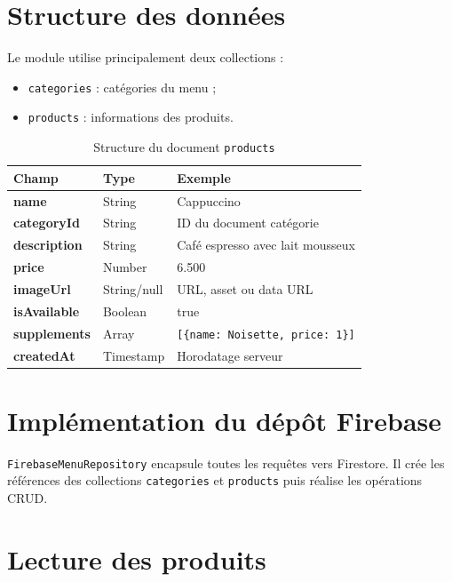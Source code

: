 \documentclass[12pt,a4paper]{report}
\begin{document}
\section{Structure des données}

Le module utilise principalement deux collections :
\begin{itemize}[label=\textbullet]
  \item \texttt{categories} : catégories du menu ;
  \item \texttt{products} : informations des produits.
\end{itemize}

\begin{table}[H]
\centering
\caption{Structure du document \texttt{products}}
\begin{tabularx}{\textwidth}{>{\bfseries}p{3cm}p{3cm}X}
\toprule
Champ & Type & Exemple \\
\midrule
name & String & Cappuccino \\
categoryId & String & ID du document catégorie \\
description & String & Café espresso avec lait mousseux \\
price & Number & 6.500 \\
imageUrl & String/null & URL, asset ou data URL \\
isAvailable & Boolean & true \\
supplements & Array & \texttt{[\{name: Noisette, price: 1\}]} \\
createdAt & Timestamp & Horodatage serveur \\
\bottomrule
\end{tabularx}
\end{table}

\section{Implémentation du dépôt Firebase}

\texttt{FirebaseMenuRepository} encapsule toutes les requêtes vers Firestore.
Il crée les références des collections \texttt{categories} et \texttt{products}
puis réalise les opérations CRUD.



\section{Lecture des produits}
\end{document}
